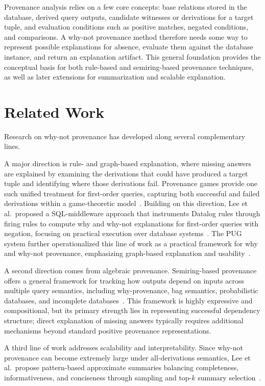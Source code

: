 \documentclass{llncs}
\begin{document}
Provenance analysis relies on a few core concepts: base relations
stored in the database, derived query outputs, candidate witnesses or
derivations for a target tuple, and evaluation conditions such as
positive matches, negated conditions, and comparisons. A why-not
provenance method therefore needs some way to represent possible
explanations for absence, evaluate them against the database instance,
and return an explanation artifact. This general foundation provides
the conceptual basis for both rule-based and semiring-based
provenance techniques, as well as later extensions for summarization
and scalable explanation.

\section{Related Work}
\label{sec:related}

Research on why-not provenance has developed along several
complementary lines.

A major direction is rule- and graph-based explanation, where missing
answers are explained by examining the derivations that could have
produced a target tuple and identifying where those derivations fail.
Provenance games provide one such unified treatment for first-order
queries, capturing both successful and failed derivations within a
game-theoretic model~\cite{Kohler2013}. Building on this direction,
Lee et al.\ proposed a SQL-middleware approach that instruments
Datalog rules through firing rules to compute why and why-not
explanations for first-order queries with negation, focusing on
practical execution over database systems~\cite{Lee2017}. The PUG
system further operationalized this line of work as a practical
framework for why and why-not provenance, emphasizing graph-based
explanation and usability~\cite{Lee2019}.

A second direction comes from algebraic provenance. Semiring-based
provenance offers a general framework for tracking how outputs depend
on inputs across multiple query semantics, including why-provenance,
bag semantics, probabilistic databases, and incomplete
databases~\cite{Green2007}. This framework is highly expressive and
compositional, but its primary strength lies in representing
successful dependency structure; direct explanation of missing answers
typically requires additional mechanisms beyond standard positive
provenance representations.

A third line of work addresses scalability and interpretability.
Since why-not provenance can become extremely large under
all-derivations semantics, Lee et al.\ propose pattern-based
approximate summaries balancing completeness, informativeness, and
conciseness through sampling and top-$k$ summary
selection~\cite{Lee2020}.
\end{document}
